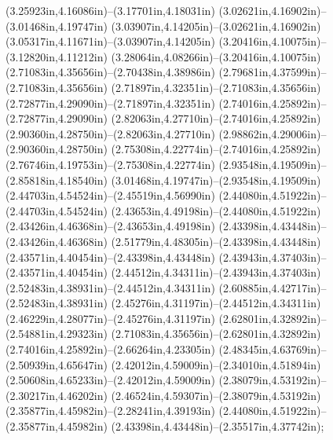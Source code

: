 (3.25923in,4.16086in)--(3.17701in,4.18031in) (3.02621in,4.16902in)--(3.01468in,4.19747in) (3.03907in,4.14205in)--(3.02621in,4.16902in) (3.05317in,4.11671in)--(3.03907in,4.14205in) (3.20416in,4.10075in)--(3.12820in,4.11212in) (3.28064in,4.08266in)--(3.20416in,4.10075in) (2.71083in,4.35656in)--(2.70438in,4.38986in) (2.79681in,4.37599in)--(2.71083in,4.35656in) (2.71897in,4.32351in)--(2.71083in,4.35656in) (2.72877in,4.29090in)--(2.71897in,4.32351in) (2.74016in,4.25892in)--(2.72877in,4.29090in) (2.82063in,4.27710in)--(2.74016in,4.25892in) (2.90360in,4.28750in)--(2.82063in,4.27710in) (2.98862in,4.29006in)--(2.90360in,4.28750in) (2.75308in,4.22774in)--(2.74016in,4.25892in) (2.76746in,4.19753in)--(2.75308in,4.22774in) (2.93548in,4.19509in)--(2.85818in,4.18540in) (3.01468in,4.19747in)--(2.93548in,4.19509in) (2.44703in,4.54524in)--(2.45519in,4.56990in) (2.44080in,4.51922in)--(2.44703in,4.54524in) (2.43653in,4.49198in)--(2.44080in,4.51922in) (2.43426in,4.46368in)--(2.43653in,4.49198in) (2.43398in,4.43448in)--(2.43426in,4.46368in) (2.51779in,4.48305in)--(2.43398in,4.43448in) (2.43571in,4.40454in)--(2.43398in,4.43448in) (2.43943in,4.37403in)--(2.43571in,4.40454in) (2.44512in,4.34311in)--(2.43943in,4.37403in) (2.52483in,4.38931in)--(2.44512in,4.34311in) (2.60885in,4.42717in)--(2.52483in,4.38931in) (2.45276in,4.31197in)--(2.44512in,4.34311in) (2.46229in,4.28077in)--(2.45276in,4.31197in) (2.62801in,4.32892in)--(2.54881in,4.29323in) (2.71083in,4.35656in)--(2.62801in,4.32892in) (2.74016in,4.25892in)--(2.66264in,4.23305in) (2.48345in,4.63769in)--(2.50939in,4.65647in) (2.42012in,4.59009in)--(2.34010in,4.51894in) (2.50608in,4.65233in)--(2.42012in,4.59009in) (2.38079in,4.53192in)--(2.30217in,4.46202in) (2.46524in,4.59307in)--(2.38079in,4.53192in) (2.35877in,4.45982in)--(2.28241in,4.39193in) (2.44080in,4.51922in)--(2.35877in,4.45982in) (2.43398in,4.43448in)--(2.35517in,4.37742in);
